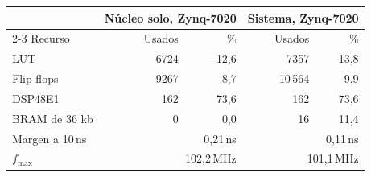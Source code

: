 \begin{tabular}{lrrrr}
\hline
 & \multicolumn{2}{c}{N\'ucleo solo, Zynq-7020} & \multicolumn{2}{c}{Sistema, Zynq-7020} \\
\cline{2-3} \cline{4-5}
Recurso & Usados & \% & Usados & \% \\
\hline
LUT & 6724 & 12,6 & 7357 & 13,8 \\
Flip-flops & 9267 & 8,7 & 10\,564 & 9,9 \\
DSP48E1 & 162 & 73,6 & 162 & 73,6 \\
BRAM de 36 kb & 0 & 0,0 & 16 & 11,4 \\
\hline
Margen a 10\,ns & \multicolumn{2}{r}{0,21\,ns} & \multicolumn{2}{r}{0,11\,ns} \\
$f_\mathrm{max}$ & \multicolumn{2}{r}{102,2\,MHz} & \multicolumn{2}{r}{101,1\,MHz} \\
\hline
\end{tabular}
